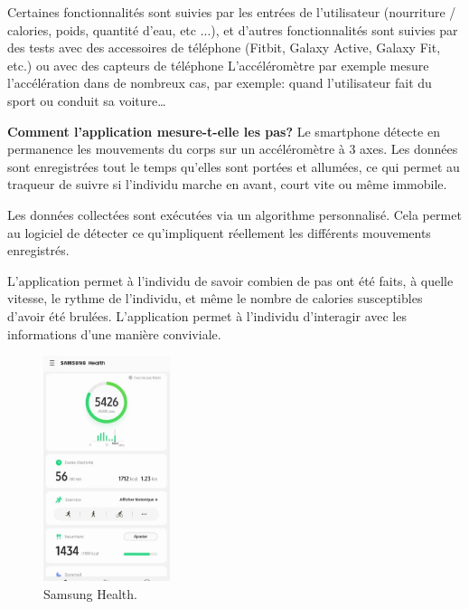 Certaines fonctionnalités sont suivies par les entrées de l'utilisateur (nourriture / calories, poids, quantité d'eau, etc ...), et d'autres fonctionnalités sont suivies par des tests avec des accessoires de téléphone (Fitbit, Galaxy Active, Galaxy Fit, etc.) ou avec des capteurs de téléphone L'accéléromètre par exemple mesure l'accélération  dans de nombreux cas, par exemple: quand l'utilisateur fait du sport ou conduit sa voiture…

\textbf{Comment l'application mesure-t-elle les pas?}
Le smartphone détecte en permanence les mouvements du corps sur un accéléromètre à 3 axes. Les données sont enregistrées tout le temps qu'elles sont portées et allumées, ce qui permet au traqueur de suivre si l'individu marche en avant, court vite ou même immobile.

Les données collectées sont exécutées via un algorithme personnalisé. Cela permet au logiciel de détecter ce qu'impliquent réellement les différents mouvements enregistrés.

L'application permet à l'individu de savoir combien de pas ont été faits, à quelle vitesse, le rythme de l'individu, et même le nombre de calories susceptibles d'avoir été brulées. L'application permet à l'individu d'interagir avec les informations d'une manière conviviale.

\begin{figure}[h!]
    \center
    \includegraphics[width=0.33\textwidth]{Images/chapter1/samsungHealth.png}
    \caption{Samsung Health.}
    \label{fig:Application}
\end{figure}
